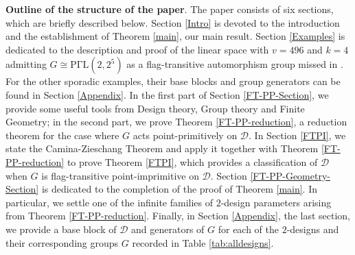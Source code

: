 \documentclass[a4paper,twopage,reqno,12pt]{amsart}
\theoremstyle{definition}
\numberwithin{equation}{section}
\newcommand{\PGaL}{\mathrm{P\Gamma L}}
\begin{document}
\noindent \textbf{Outline of the structure of the paper}. The paper consists of six sections, which are briefly described below. Section \ref{Intro} is devoted to the introduction and the establishment of Theorem \ref{main}, our main result. Section \ref{Examples} is dedicated to the description and proof of the linear space with $v=496$ and $k=4$ admitting $G\cong \PGaL(2,2^{5})$ as a flag-transitive automorphism group missed in \cite{BDDKLS, Saxl,De}.
For the other sporadic examples, their base blocks and group generators can be found in Section \ref{Appendix}. In the first part of Section \ref{FT-PP-Section}, we provide some useful tools from Design theory, Group theory and Finite Geometry; in the second part, we prove Theorem \ref{FT-PP-reduction}, a reduction theorem for the case where $G$ acts point-primitively on $\mathcal{D}$. In Section \ref{FTPI}, we state the Camina-Zieschang Theorem and apply it together with Theorem \ref{FT-PP-reduction} to prove Theorem \ref{FTPI}, which provides a classification of $\mathcal{D}$ when $G$ is flag-transitive point-imprimitive on $\mathcal{D}$. Section \ref{FT-PP-Geometry-Section} is dedicated to the completion of the proof of Theorem \ref{main}. In particular, we settle one of the infinite families of $2$-design parameters arising from Theorem \ref{FT-PP-reduction}.
Finally, in Section \ref{Appendix}, the last section, we provide a base block of $\mathcal{D}$ and generators of $G$ for each of the $2$-designs and their corresponding groups $G$ recorded in Table \ref{tab:alldesigns}.
\end{document}

